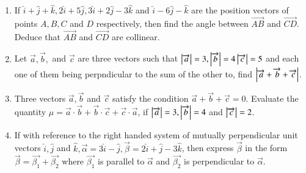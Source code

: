 \documentclass{article}
\theoremstyle{remark}
\begin{document}
\begin{enumerate}
\item If $\hat{i}+\hat{j}+\hat{k}, 2\hat{i}+5\hat{j}, 3\hat{i}+2\hat{j}-3\hat{k}$ and $\hat{i}-6\hat{j}-\hat{k}$ are the position vectors of points $A, B, C$ and $D$ respectively, then find the angle between $\overrightarrow{AB}$ and $\overrightarrow{CD}$. Deduce that $\overrightarrow{AB}$ and $\overrightarrow{CD}$ are collinear.
\item Let $\overrightarrow{a}, \overrightarrow{b},$ and $ \overrightarrow{c}$ are three vectors such that $\left\vert\overrightarrow{a}\right\vert=3, \left\vert\overrightarrow{b}\right\vert=4 \left\vert\overrightarrow{c}\right\vert=5$ and each one of them being perpndicular to the sum of the other to, find $\left\vert\overrightarrow{a}+\overrightarrow{b}+\overrightarrow{c}\right\vert$.
\item Three vectors $\overrightarrow{a}, \overrightarrow{b}$ and $\overrightarrow{c}$ satisfy the condition $\overrightarrow{a} +\overrightarrow{b} +\overrightarrow{c} =0$. Evaluate the quantity $\mu = \overrightarrow{a}\cdot \overrightarrow{b} +\overrightarrow{b} \cdot \overrightarrow{c} +\overrightarrow{c} \cdot \overrightarrow{a}$, if $\left\vert\overrightarrow{a}\right\vert=3, \left\vert\overrightarrow{b}\right\vert=4$ and $\left\vert\overrightarrow{c}\right\vert=2$. 
\item If with reference to the right handed system of mutually perpendicular unit vectors $\hat{i},\hat{j}$ and $\hat{k}, \overrightarrow{\alpha} = 3\hat{i} -\hat{j}, \overrightarrow{\beta}= 2\hat{i} +\hat{j} -3\hat{k}$, then express $\overrightarrow{\beta}$ in the form $\overrightarrow{\beta} = \overrightarrow{\beta_1} +\overrightarrow{\beta_2}$ where $\overrightarrow{\beta_1}$ is parallel to $\overrightarrow{\alpha}$ and $\overrightarrow{\beta_2}$ is perpendicular to $\overrightarrow{\alpha}$.
\end{enumerate}
\end{document}
